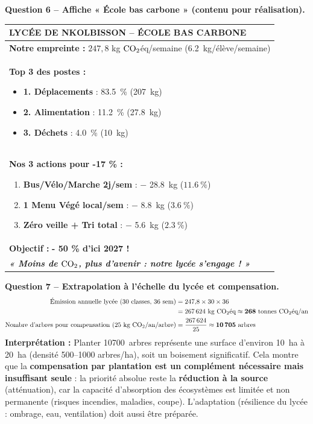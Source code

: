 \documentclass[11pt]{article}
\begin{document}
\begin{exoresolu}
\textbf{Question 6 -- Affiche « École bas carbone » (contenu pour réalisation).}
\begin{center}
\begin{tabularx}{\linewidth}{|X|}\hline
\rowcolor{popgreenL} \textbf{\Large LYCÉE DE NKOLBISSON -- ÉCOLE BAS CARBONE} \\ \hline
\textbf{Notre empreinte :} $247,8$ kg $\ce{CO2}$éq/semaine (\SI{6,2}{kg/élève/semaine}) \\ 
\textbf{Top 3 des postes :} 
\begin{itemize}
\item \textbf{1. Déplacements} : \SI{83,5}{\%} (\SI{207}{kg})
\item \textbf{2. Alimentation} : \SI{11,2}{\%} (\SI{27,8}{kg})
\item \textbf{3. Déchets} : \SI{4,0}{\%} (\SI{10}{kg})
\end{itemize} \\
\textbf{Nos 3 actions pour -17 \% :} 
\begin{enumerate}
\item \textbf{Bus/Vélo/Marche 2j/sem} : $-$ \SI{28,8}{kg} ($\SI{11,6}{\%}$)
\item \textbf{1 Menu Végé local/sem} : $-$ \SI{8,8}{kg} ($\SI{3,6}{\%}$)
\item \textbf{Zéro veille + Tri total} : $-$ \SI{5,6}{kg} ($\SI{2,3}{\%}$)
\end{enumerate} \\
\textbf{Objectif :} \textbf{- 50 \% d'ici 2027 !} \\
\rowcolor{popgoldL} \textbf{\textit{« Moins de $\ce{CO2}$, plus d'avenir : notre lycée s'engage ! »}} \\ \hline
\end{tabularx}
\end{center}

\textbf{Question 7 -- Extrapolation à l'échelle du lycée et compensation.}
\begin{align*}
\text{Émission annuelle lycée (30 classes, 36 sem)} &= 247{,}8 \times 30 \times 36 \\
&= 267\,624 \text{ kg $\ce{CO2}$éq} \approx \mathbf{268 \text{ tonnes $\ce{CO2}$éq/an}} \\
\text{Nombre d'arbres pour compensation (25 kg $\ce{CO2}$/an/arbre)} &= \frac{267\,624}{25} \approx \mathbf{10\,705 \text{ arbres}}
\end{align*}
\textbf{Interprétation :} Planter \SI{10700}{arbres} représente une surface d'environ \SI{10}{ha} à \SI{20}{ha} (densité 500--1000 arbres/ha), soit un boisement significatif. Cela montre que la \textbf{compensation par plantation est un complément nécessaire mais insuffisant seule} : la priorité absolue reste la \textbf{réduction à la source} (atténuation), car la capacité d'absorption des écosystèmes est limitée et non permanente (risques incendies, maladies, coupe). L'adaptation (résilience du lycée : ombrage, eau, ventilation) doit aussi être préparée.

\end{exoresolu}
\end{document}
